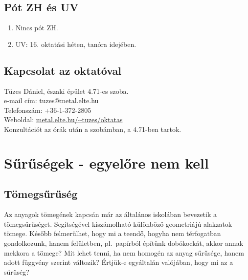 \documentclass[12pt,a4paper]{scrartcl}
\begin{document}
\subsection{Pót ZH és UV}

\begin{enumerate}
\item Nincs pót ZH.
\item UV: 16. oktatási héten, tanóra idejében.
\end{enumerate}

\fi

\subsection{Kapcsolat az oktatóval}
Tüzes Dániel, északi épület 4.71-es szoba.\\
e-mail cím: tuzes@metal.elte.hu\\
Telefonszám: +36-1-372-2805\\
Weboldal: \href{http://metal.elte.hu/~tuzes/oktatas}{metal.elte.hu/\textasciitilde tuzes/oktatas}\\
Konzultációt az órák után a szobámban, a 4.71-ben tartok.
\newpage

\section{Sűrűségek - egyelőre nem kell}
\subsection{Tömegsűrűség}
Az anyagok tömegének kapcsán már az általános iskolában bevezetik a tömegsűrűséget. Segítségével kiszámolható különböző geometriájú alakzatok tömege. Később felmerülhet, hogy mi a teendő, hogyha nem térfogatban gondolkozunk, hanem felületben, pl.\ papírból építünk dobókockát, akkor annak mekkora a tömege? Mit lehet tenni, ha nem homogén az anyag sűrűsége, hanem adott függvény szerint változik? Értjük-e egyáltalán valójában, hogy mi az a sűrűség?
\end{document}
